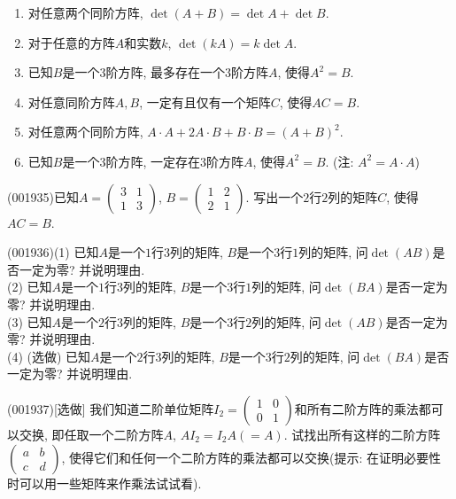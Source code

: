 \begin{enumerate}[\blank{30}1.]
\item 对任意两个同阶方阵, $\det(A+B)=\det A+\det B$.\\ 
\item 对于任意的方阵$A$和实数$k$, $\det (kA)=k\det A$.\\ 
\item 已知$B$是一个$3$阶方阵, 最多存在一个$3$阶方阵$A$, 使得$A^2=B$.\\ 
\item 对任意同阶方阵$A,B$, 一定有且仅有一个矩阵$C$, 使得$AC=B$.\\ 
\item 对任意两个同阶方阵, $A\cdot A+2A\cdot B+B\cdot B=(A+B)^2$.\\ 
\item 已知$B$是一个$3$阶方阵, 一定存在$3$阶方阵$A$, 使得$A^2=B$. (注: $A^2=A\cdot A$)\\ 
\end{enumerate}
\item (001935)已知$A=\left(\begin{array}{cc}3&1\\1&3\end{array}\right)$, $B=\left(\begin{array}{cc}1&2\\2&1\end{array}\right)$. 写出一个$2$行$2$列的矩阵$C$, 使得$AC=B$.
\item (001936)(1) 已知$A$是一个$1$行$3$列的矩阵, $B$是一个$3$行$1$列的矩阵, 问$\det(AB)$是否一定为零? 并说明理由.\\ 
(2) 已知$A$是一个$1$行$3$列的矩阵, $B$是一个$3$行$1$列的矩阵, 问$\det(BA)$是否一定为零? 并说明理由.\\ 
(3) 已知$A$是一个$2$行$3$列的矩阵, $B$是一个$3$行$2$列的矩阵, 问$\det(AB)$是否一定为零? 并说明理由.\\ 
(4) (选做) 已知$A$是一个$2$行$3$列的矩阵, $B$是一个$3$行$2$列的矩阵, 问$\det(BA)$是否一定为零? 并说明理由.
\item (001937)[选做]
我们知道二阶单位矩阵$I_2=\left(\begin{array}{cc}1&0\\0&1\end{array}\right)$和所有二阶方阵的乘法都可以交换, 即任取一个二阶方阵$A$, $AI_2=I_2 A(=A)$. 试找出所有这样的二阶方阵$\left(\begin{array}{cc}a&b\\c&d\end{array}\right)$, 使得它们和任何一个二阶方阵的乘法都可以交换(提示: 在证明必要性时可以用一些矩阵来作乘法试试看).
